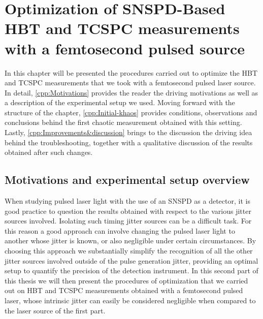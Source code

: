 \chapter{Optimization of SNSPD-Based HBT and TCSPC measurements with a femtosecond pulsed source}
\label{Capitolo4}

In this chapter will be presented the procedures carried out to optimize the HBT and TCSPC measurements that we took with a femtosecond pulsed laser source.
In detail, \autoref{cpp:Motivations} provides the reader the driving motivations as well as a description of the experimental setup we used.
Moving forward with the structure of the chapter, \autoref{cpp:Initial-khaos} provides conditions, observations and conclusions behind the first chaotic measurement obtained with this setting.
Lastly, \autoref{cpp:Improvements&discussion} brings to the discussion the driving idea behind the troubleshooting, together with a qualitative discussion of the results obtained after such changes.



\section{Motivations and experimental setup overview}
\label{cpp:Motivations}
When studying pulsed laser light with the use of an SNSPD as a detector, it is good practice to question the results obtained with respect to the various jitter sources involved. Isolating such timing jitter sources can be a difficult task. For this reason a good approach can involve changing the pulsed laser light to another whose jitter is known, or also negligible under certain circumstances. By choosing this approach we substantially simplify the recognition of all the other jitter sources involved outside of the pulse generation jitter, providing an optimal setup to quantify the precision of the detection instrument. 
In this second part of this thesis we will then present the procedures of optimization that we carried out on HBT and TCSPC measurements obtained with a femtosecond pulsed laser, whose intrinsic jitter can easily be considered negligible when compared to the laser source of the first part.

